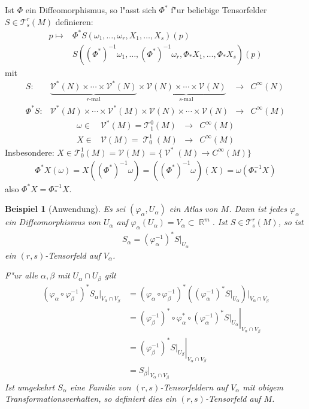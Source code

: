 \documentclass[paper=A4, twoside, chapterprefix=true, bibliography=totoc, headsepline]{scrbook}
\let\temp\phi{}
\let\phi\varphi{}
\let\varphi\temp{}
\let\temp\theta{}
\let\theta\vartheta{}
\let\vartheta\temp{}
\let\temp\epsilon{}
\let\epsilon\varepsilon{}
\let\varepsilon\temp{}
\let\temp\rho{}
\let\rho\varrho{}
\let\varrho\temp{}
\DeclareMathOperator{\R}{\mathbb{R}}
\DeclareMathOperator{\calT}{\mathcal{T}}
\DeclareMathOperator{\calV}{\mathcal{V}}
\newcommand{\X}{\times}
\theoremstyle{plain}
\theoremstyle{nonumberplain}
\newtheorem{bsp}{Beispiel}
\theoremstyle{empty}
\theoremstyle{break}
\begin{document}
Ist $\Phi$ ein Diffeomorphismus, so l"asst sich $\Phi^{*}$ f"ur beliebige Tensorfelder $S \in \mathcal T_s^r(M)$ definieren:
\begin{align*}
	p \mapsto {}& \Phi^{*}S (\omega_1,\ldots,\omega_r,X_1,\ldots,X_s)(p)\\
	& S((\Phi^{*})^{-1}\omega_1, \ldots, (\Phi^{*})^{-1}\omega_{r}, \Phi_{*}X_1,\ldots,\Phi_{*}X_s)(p)
\end{align*}
mit
	\[ \begin{array}{rccc} S \colon& \underbrace{\mathcal V^{*}(N) \X \cdots \X \mathcal V^{*}(N)}_{r\text{-mal}} \X \underbrace{ \mathcal V(N) \X \cdots \X \mathcal V(N)}_{s\text{-mal}} &\to& C^{\infty}(N)\\
		\Phi^*S \colon& \mathcal V^{*}(M) \X \cdots \X \mathcal V^{*}(M) \X \mathcal V(N) \X \cdots \X \mathcal V(N) &\to& C^{\infty}(M) \end{array} \]
	\[ \begin{array}{rccc} \omega \in & \mathcal V^{*}(M) = \mathcal T_1^0(M) &\to& C^{\infty}(M)\\
		X \in & \mathcal V(M) = \calT_0^1(M) &\to& C^{\infty}(M) \end{array} \]
Insbesondere: $X \in \mathcal T_0^1(M) = \mathcal V(M) = \{\calV^*(M) \to C^{\infty}(M)\}$
\begin{align*}
  \Phi^{*}X(\omega) = X((\Phi^{*})^{-1}\omega) = ((\Phi^{*})^{-1}\omega)(X) = \omega(\Phi_{*}^{-1}X)
\end{align*}
also $\Phi^{*}X = \Phi_{*}^{-1}X$.

\begin{bsp}[Anwendung]
  Es sei $(\phi_{\alpha},U_{\alpha})$ ein Atlas von $M$. Dann ist jedes $\phi_{\alpha}$ ein Diffeomorphismus von $U_{\alpha}$ auf $\phi_{\alpha}(U_{\alpha}) = V_{\alpha} \subset \R^m$. Ist $S \in \mathcal T_s^r(M)$, so ist
  \begin{align*}
    S_{\alpha} = (\phi_{\alpha}^{-1})^{*}S|_{U_\alpha}
  \end{align*}
  ein $(r,s)$-Tensorfeld auf $V_{\alpha}$.


  F"ur alle $\alpha, \beta$ mit $U_{\alpha} \cap U_{\beta}$ gilt
  \begin{align*}
    (\phi_{\alpha} \circ \phi_{\beta}^{-1})^{*}S_{\alpha}|_{V_{\alpha} \cap V_{\beta}} & = (\phi_{\alpha} \circ \phi_{\beta}^{-1})^{*}\left((\phi_{\alpha}^{-1})^{*}S|_{U_{\alpha}}\right)|_{V_{\alpha}\cap V_{\beta}}\\
    & = \left.(\phi_{\beta}^{-1})^{*} \circ \phi_{\alpha}^{*} \circ (\phi_{\alpha}^{-1})^{*} S|_{U_{\alpha}}\right|_{V_{\alpha} \cap V_{\beta}}\\
    & = \left.(\phi_{\beta}^{-1})^{*}S|_{U_{\beta}}\right|_{V_{\alpha} \cap V_{\beta}}\\
    & = S_{\beta}|_{V_{\alpha} \cap V_{\beta}}
  \end{align*}
  Ist umgekehrt $S_\alpha$ eine Familie von $(r,s)$-Tensorfeldern auf $V_{\alpha}$ mit obigem Transformationsverhalten, so definiert dies ein $(r,s)$-Tensorfeld auf $M$.
\end{bsp}
\end{document}
